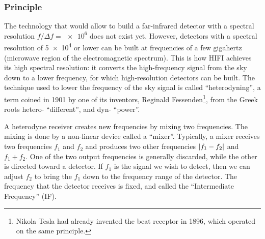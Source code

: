 \subsubsection{Principle}
The technology that would allow to build a far-infrared detector with a spectral resolution $f/\Delta f = \num{e6}$ does not exist yet.
However, detectors with a spectral resolution of \num{5e4} or lower can be built at frequencies of a few gigahertz (microwave region of the electromagnetic spectrum).
This is how HIFI achieves its high spectral resolution: it converts the high-frequency signal from the sky down to a lower frequency, for which high-resolution detectors can be built.
The technique used to lower the frequency of the sky signal is called ``heterodyning'',
a term coined in 1901 by one of its inventors,
Reginald Fessenden\footnote{
   Nikola Tesla had already invented the beat receptor in 1896, which operated on the same principle.
},
from the Greek roots hetero- ``different'', and dyn- ``power''.


A heterodyne receiver creates new frequencies by mixing two frequencies.
The mixing is done by a non-linear device called a ``mixer''.
Typically, a mixer receives two frequencies $f_1$ and $f_2$ and produces two other frequencies $\abs{f_1-f_2}$ and $f_1+f_2$.
One of the two output frequencies is generally discarded, while the other is directed toward a detector.
If $f_1$ is the signal we wish to detect, then we can adjust $f_2$ to bring the $f_1$ down to the frequency range of the detector.
The frequency that the detector receives is fixed, and called the ``Intermediate Frequency'' (IF).

